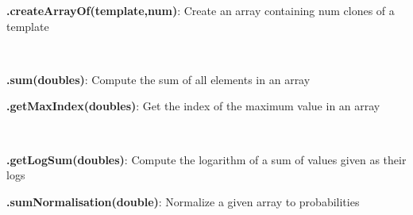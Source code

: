 \documentclass[10pt]{scrartcl}
\newcommand{\entry}[3]{{\bfseries #1#2}: #3}
\begin{document}
\begin{flushleft}
\entry{\ArrayHandler}{.createArrayOf(template,num)}{Create an array containing num clones of a template}

~

\entry{\ToolBox}{.sum(doubles)}{Compute the sum of all elements in an array}

\entry{\ToolBox}{.getMaxIndex(doubles)}{Get the index of the maximum value in an array}

~

\entry{\Normalisation}{.getLogSum(doubles)}{Compute the logarithm of a sum of values given as their logs}

\entry{\Normalisation}{.sumNormalisation(double)}{Normalize a given array to probabilities}
\end{flushleft}
\end{document}
